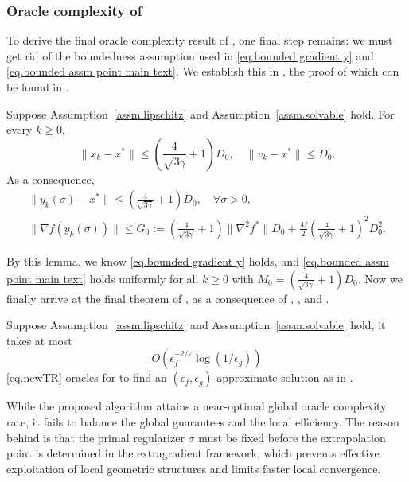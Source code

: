 \documentclass{article}
\begin{document}
\subsubsection{Oracle complexity of }
To derive the final oracle complexity result of , one final step remains: we must get rid of the boundedness assumption used in \eqref{eq.bounded gradient y} and \eqref{eq.bounded assm point main text}. We establish this in , the proof of which can be found in .
\begin{lemma}
    \label{lem.bounded iterate}
    Suppose Assumption~\ref{assm.lipschitz} and Assumption~\ref{assm.solvable} hold. For every $k\geq 0$,
    \begin{equation}
        \label{eq.bounded iterate}
        \|x_k- x^*\| \leq \left(\frac{4}{\sqrt{3\gamma}}+1\right)D_0, \quad \|v_k-x^*\|\leq D_0.
    \end{equation}
    As a consequence,
    \begin{gather}
        \label{eq.bounded iterate y}
        \|y_k(\sigma)-x^*\| \leq \left(\frac{4}{\sqrt{3\gamma}}+1\right)D_0, \quad \forall \sigma>0,\\
        \label{eq.ub yk sigma}
        \|\nabla f(y_k(\sigma))\| \leq G_0:= \left(\frac{4}{\sqrt{3\gamma}}+1\right)\|\nabla ^2 f^*\|D_0+\frac{M}{2}\left(\frac{4}{\sqrt{3\gamma}}+1\right)^2 D_0^2.
    \end{gather}
\end{lemma}
By this lemma, we know \eqref{eq.bounded gradient y} holds, and \eqref{eq.bounded assm point main text} holds uniformly for all $k\geq0$ with $M_0 =\left(\frac{4}{\sqrt{3\gamma}}+1\right)D_0 $. Now we finally arrive at the final theorem of , as a consequence of , , and .
\begin{theorem}
    \label{thm.final complexity of msatr}
    Suppose Assumption~\ref{assm.lipschitz} and Assumption~\ref{assm.solvable} hold, it takes at most
    \begin{equation}
        \label{eq.final complexity of msatr}
        O\left(\epsilon_f^{-2/7}\log\left(1/\epsilon_g\right)\right)
    \end{equation}
    \ref{eq.newTR} oracles for  to find an $(\epsilon_f,\epsilon_g)$-approximate solution as in .
\end{theorem}
While the proposed algorithm attains a near-optimal global oracle complexity rate, it fails to balance the global guarantees and the local efficiency. The reason behind is that the primal regularizer $\sigma$ must be fixed before the extrapolation point is determined in the extragradient framework, which prevents effective exploitation of local geometric structures and limits faster local convergence.
\end{document}
